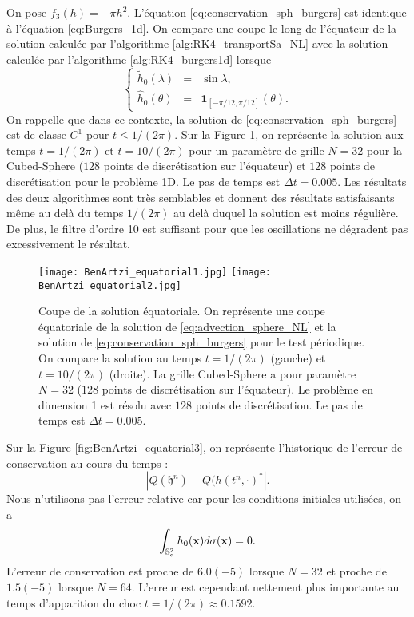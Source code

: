 On pose $f_3(h) = - \pi h^2$. L'équation \eqref{eq:conservation_sph_burgers} est identique à l'équation \eqref{eq:Burgers_1d}. On compare une coupe le long de l'équateur de la solution calculée par l'algorithme \ref{alg:RK4_transportSa_NL} avec la solution calculée par l'algorithme \ref{alg:RK4_burgers1d} lorsque
\begin{equation}
\left\lbrace
\begin{array}{rcl}
\tilde{h}_0(\lambda) & = & \sin \lambda, \\
\hat{h}_0(\theta) & = & \mathbf{1}_{[-\pi/12, \pi/12]}(\theta).
\end{array}
\right.
\end{equation}
On rappelle que dans ce contexte, la solution de \eqref{eq:conservation_sph_burgers} est de classe $C^1$ pour $t \leq 1/(2 \pi)$. Sur la Figure \ref{fig:BenArtzi_equatorial1}, on représente la solution aux temps $t=1/(2 \pi)$ et $t=10/(2\pi)$ pour un paramètre de grille $N=32$ pour la Cubed-Sphere ($128$ points de discrétisation sur l'équateur) et $128$ points de discrétisation pour le problème 1D. Le pas de temps est $\Delta t=0.005$. Les résultats des deux algorithmes sont très semblables et donnent des résultats satisfaisants même au delà du temps $1/(2 \pi)$ au delà duquel la solution est moins régulière. De plus, le filtre d'ordre 10 est suffisant pour que les oscillations ne dégradent pas excessivement le résultat.

\begin{figure}[htbp]
\begin{center}
\texttt{[image: BenArtzi\_equatorial1.jpg]}
\texttt{[image: BenArtzi\_equatorial2.jpg]}
\end{center}
\caption{Coupe de la solution équatoriale. On représente une coupe équatoriale de la solution de \eqref{eq:advection_sphere_NL} et la solution de \eqref{eq:conservation_sph_burgers} pour le test périodique. On compare la solution au temps $t=1/(2\pi)$ (gauche) et $t=10/(2\pi)$ (droite). La grille Cubed-Sphere a pour paramètre $N=32$ ($128$ points de discrétisation sur l'équateur). Le problème en dimension 1 est résolu avec $128$ points de discrétisation. Le pas de temps est $\Delta t = 0.005$.}
\label{fig:BenArtzi_equatorial1}
\end{figure} 

Sur la Figure \ref{fig:BenArtzi_equatorial3}, on représente l'historique de l'erreur de conservation au cours du temps :
\begin{equation}
|Q(\mathfrak{h}^n) - Q(h(t^n, \cdot)^*|.
\end{equation}
Nous n'utilisons pas l'erreur relative car pour les conditions initiales utilisées, on a
\begin{equation}
\displaystyle\int_{\mathbb{S}_a^2} h_0(\mathbf{x}) d \sigma(\mathbf{x}) = 0.
\end{equation}
L'erreur de conservation est proche de $6.0 (-5)$ lorsque $N=32$ et proche de $1.5 (-5)$ lorsque $N=64$. L'erreur est cependant nettement plus importante au temps d'apparition du choc $t=1/(2\pi) \approx 0.1592$. 

